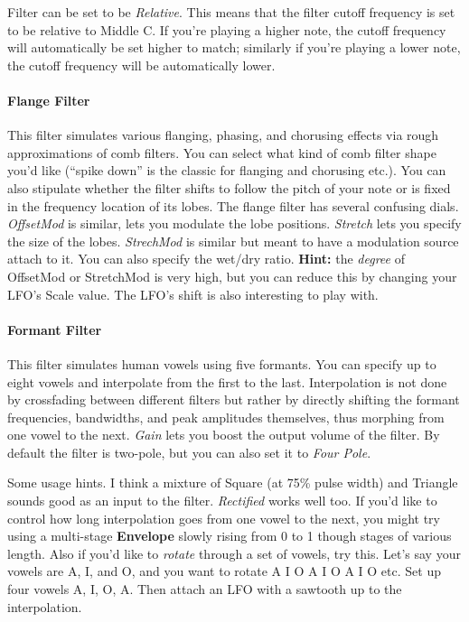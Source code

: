 \documentclass{article}
\begin{document}
Filter can be set to be {\it Relative}.  This means that the filter cutoff frequency is set to be relative to Middle C.  If you're playing a higher note, the cutoff frequency will automatically be set higher to match; similarly if you're playing a lower note, the cutoff frequency will be automatically lower.



\paragraph{Flange Filter} This filter simulates various flanging, phasing, and chorusing effects via rough approximations of comb filters.  You can select what kind of comb filter shape you'd like (``spike down'' is the classic for flanging and chorusing etc.).    You can also stipulate whether the filter shifts to follow the pitch of your note or is fixed in the frequency location of its lobes.    The flange filter has several confusing dials.  {\it OffsetMod} is similar, lets you modulate the lobe positions.  {\it Stretch} lets you specify the size of the lobes.  {\it StrechMod} is similar but meant to have a modulation source attach to it.  You can also specify the wet/dry ratio. {\bf Hint:}  the {\it degree} of OffsetMod or StretchMod is very high, but you can reduce this by changing your LFO's Scale value.  The LFO's shift is also interesting to play with.

\paragraph{Formant Filter} This filter simulates human vowels using five formants.  You can specify up to eight vowels and interpolate from the first to the last. Interpolation is not done by crossfading between different filters but rather by directly shifting the formant frequencies, bandwidths, and peak amplitudes themselves, thus morphing from one vowel to the next.   {\it Gain} lets you boost the output volume of the filter.  By default the filter is two-pole, but you can also set it to {\it Four Pole}.

Some usage hints.  I think a mixture of Square (at 75\% pulse width) and Triangle sounds good as an input to the filter.  {\it Rectified} works well too.  If you'd like to control how long interpolation goes from one vowel to the next, you might try using a multi-stage {\bf Envelope} slowly rising from 0 to 1 though stages of various length.  Also if you'd like to {\it rotate} through a set of vowels, try this.  Let's say your vowels are A, I, and O, and you want to rotate A I O A I O A I O etc.  Set up four vowels A, I, O, A.  Then attach an LFO with a sawtooth up to the interpolation.
\end{document}
